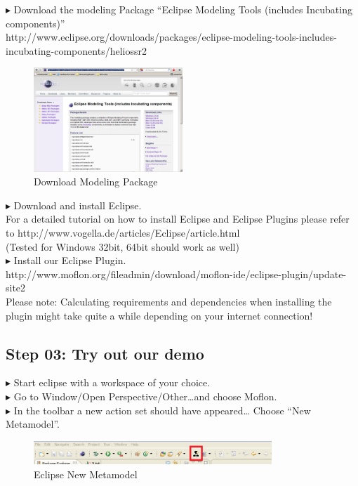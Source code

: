 $\blacktriangleright$ Download the modeling Package ``Eclipse Modeling Tools
(includes Incubating components)''\\
http://www.eclipse.org/downloads/packages/eclipse-modeling-tools-includes-incubating-components/heliossr2\\
\begin{figure}[h]
	\centering
  \includegraphics[width=0.5\textwidth]{pics/eclipse_modelingpackage.png}
	\caption{Download Modeling Package}
\end{figure}

$\blacktriangleright$ Download and install Eclipse.\\
For a detailed tutorial on how to install Eclipse and Eclipse Plugins please
refer to http://www.vogella.de/articles/Eclipse/article.html\\
(Tested for Windows 32bit, 64bit should work as well)\\

$\blacktriangleright$ Install our Eclipse Plugin.\\
http://www.moflon.org/fileadmin/download/moflon-ide/eclipse-plugin/update-site2\\
Please note: Calculating requirements and dependencies when installing the
plugin might take quite a while depending on your internet connection! 

\subsection{Step 03: Try out our demo}
$\blacktriangleright$ Start eclipse with a workspace of your choice.\\

$\blacktriangleright$ Go to Window/Open Perspective/Other\ldots and choose
Moflon.\\

$\blacktriangleright$ In the toolbar a new action set should have appeared\ldots
Choose ``New Metamodel''.\\
\begin{figure}[h]
	\centering
  \includegraphics[width=0.8\textwidth]{pics/eclipse_metamodelButton.png}
	\caption{Eclipse New Metamodel}
\end{figure}


